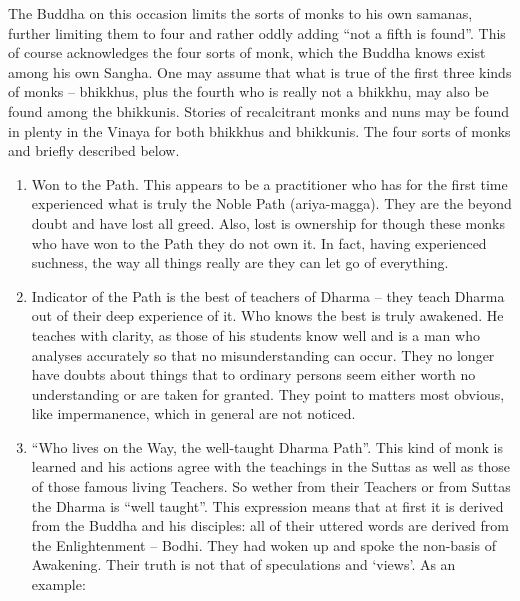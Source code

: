 The Buddha on this occasion limits the sorts of monks to his own samanas, further limiting them to four and rather oddly adding “not a fifth is found”. This of course acknowledges the four sorts of monk, which the Buddha knows exist among his own Sangha. One may assume that what is true of the first three kinds of monks – bhikkhus, plus the fourth who is really not a bhikkhu, may also be found among the bhikkunis. Stories of recalcitrant monks and nuns may be found in plenty in the Vinaya for both bhikkhus and bhikkunis. The four sorts of monks and briefly described below.
\begin{enumerate}
\item Won to the Path. This appears to be a practitioner who has for the first time experienced what is truly the Noble Path (ariya-magga). They are the beyond doubt and have lost all greed. Also, lost is ownership for though these monks who have won to the Path they do not own it. In fact, having experienced suchness, the way all things really are they can let go of everything.
   
\item Indicator of the Path is the best of teachers of Dharma – they teach Dharma out of their deep experience of it. Who knows the best is truly awakened. He teaches with clarity, as those of his students know well and is a man who analyses accurately so that no misunderstanding can occur. They no longer have doubts about things that to ordinary persons seem either worth no understanding or are taken for granted. They point to matters most obvious, like impermanence, which in general are not noticed.
   
\item	“Who lives on the Way, the well-taught Dharma Path”. This kind of monk is learned and his actions agree with the teachings in the Suttas as well as those of those famous living Teachers. So wether from their Teachers or from Suttas the Dharma is “well taught”. This expression means that at first it is derived from the Buddha and his disciples: all of their uttered words are derived from the Enlightenment – Bodhi. They had woken up and spoke the non-basis of Awakening. Their truth is not that of speculations and `views'. As an example:


\end{enumerate}
